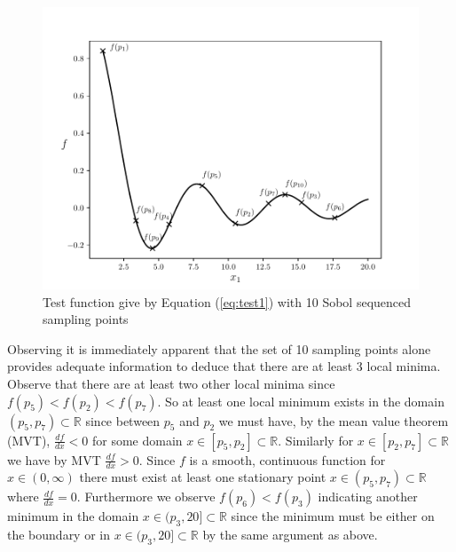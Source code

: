 \begin{figure} [H] 
\centerline{\includegraphics[scale=1.0]{./Fig1.pdf}}
{\caption{Test function give by Equation (\ref{eq:test1}) with 10 Sobol sequenced sampling points} \label{fig:pot1}}
\end{figure}

Observing  it is immediately apparent that the set of 10 sampling points alone provides adequate information to deduce that there are at least 3 local minima. Observe that there are at least two other local minima since $ f(p_5) < f(p_2) < f(p_7)$. So at least one local minimum exists in the domain $(p_5, p_7) \subset \mathbb{R}$ since between $p_5$ and $p_2$ we must have, by the mean value theorem (MVT), $\frac{df}{dx} < 0$ for some domain $x \in [p_5, p_2] \subset \mathbb{R}$. Similarly for $x \in [p_2, p_7] \subset \mathbb{R}$ we have by MVT $\frac{df}{dx} > 0$. Since $f$ is a smooth, continuous function for $x \in (0, \infty)$ there must exist at least one stationary point $x  \in (p_5, p_7)  \subset \mathbb{R}$ where $\frac{df}{dx} = 0$. Furthermore we observe $f(p_6) < f(p_3)$ indicating another minimum in the domain $x  \in (p_3, 20] \subset \mathbb{R}$ since the minimum must be either on the boundary or in $x  \in (p_3, 20] \subset \mathbb{R}$ by the same argument as above. %

